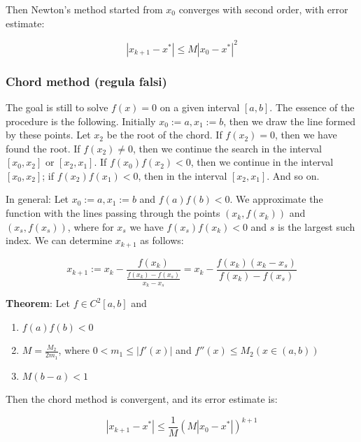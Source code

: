 \documentclass[margin=0px]{article}
\begin{document}
\noindent Then Newton's method started from $x_{0}$ converges with second order, with error estimate:

\begin{displaymath}
    |x_{k+1} - x^{*}| \leq M|x_{0} - x^{*}|^{2}
\end{displaymath}
\subsubsection{Chord method (regula falsi)}

The goal is still to solve $f(x) = 0$ on a given interval $[a, b]$.
The essence of the procedure is the following. Initially $x_{0} := a, x_{1} := b$, then we draw the line
formed by these points. Let $x_{2}$ be the root of the chord. If $f(x_{2}) = 0$, then we have found the root. If $f(x_{2}) \not = 0$,
then we continue the search in the interval $[x_{0},x_{2}]$ or $[x_{2},x_{1}]$. If $f(x_{0})f(x_{2}) < 0$, then
we continue in the interval $[x_{0},x_{2}]$; if $f(x_{2}) f(x_{1}) < 0$, then in the interval $[x_{2}, x_{1}]$. And so on.

In general: Let $x_{0} := a, x_{1} := b$ and	$f(a)f(b) < 0$. We approximate the function with the lines passing through the points
$(x_{k},f(x_{k}))$ and $(x_{s},f(x_{s}))$, where for $x_{s}$ we have $f(x_{s})f(x_{k})<0$ and $s$ is the largest such index.
We can determine $x_{k+1}$ as follows:

\begin{displaymath}
    x_{k+1} := x_{k} -
    \frac
    {f(x_{k})}
    {\frac{f(x_{k}) - f(x_{s})}{x_{k}-x_{s}}} =
    x_{k} -
    \frac
    {f(x_{k}) (x_{k} -x_{s}) }
    {f(x_{k}) - f(x_{s})}
\end{displaymath}

\noindent \textbf{Theorem}: Let $f \in C^{2}[a,b]$ and
\begin{enumerate}
    \item	$f(a)f(b)<0$
    \item	$M = \frac{M_{2}}{2m_{1}}$, where $0<m_{1} \leq |f'(x)|$ and $f''(x) \leq M_{2} (x \in (a,b))$
    \item	$M(b-a) < 1$
\end{enumerate}

\noindent Then the chord method is convergent, and its error estimate is:

\begin{displaymath}
    |x_{k+1} - x^{*}| \leq \frac{1}{M}(M|x_{0}-x^{*}|)^{k+1}
\end{displaymath}
\end{document}
